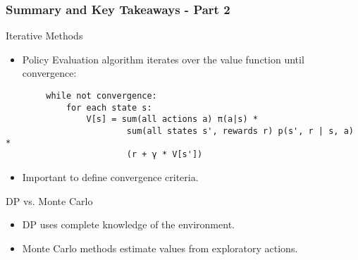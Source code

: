 \documentclass[aspectratio=169]{beamer}
\begin{document}
\begin{frame}[fragile]
    \frametitle{Summary and Key Takeaways - Part 2}
    
    \begin{block}{Iterative Methods}
        \begin{itemize}
            \item Policy Evaluation algorithm iterates over the value function until convergence:
        \end{itemize}
        \begin{lstlisting}
        while not convergence:
            for each state s:
                V[s] = sum(all actions a) π(a|s) *
                        sum(all states s', rewards r) p(s', r | s, a) *
                        (r + γ * V[s'])
        \end{lstlisting}
        
        \begin{itemize}
            \item Important to define convergence criteria.
        \end{itemize}
    \end{block}
    
    \begin{block}{DP vs. Monte Carlo}
        \begin{itemize}
            \item DP uses complete knowledge of the environment.
            \item Monte Carlo methods estimate values from exploratory actions.
        \end{itemize}
    \end{block}
\end{frame}
\end{document}
